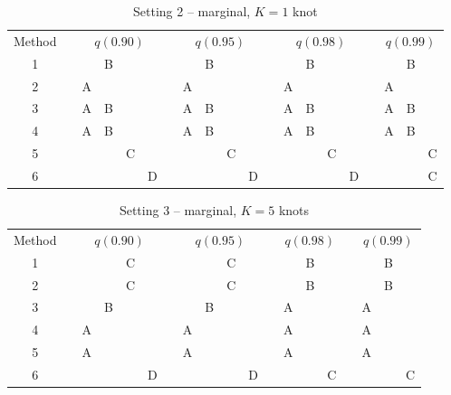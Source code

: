 \begin{table}[htbp]
  \centering
  \caption{Setting 2 -- \Skewt marginal, $K = 1$ knot}
  \label{sttbl:st1sim}
  \begin{tabular}{c c cccc c cccc c cccc c ccc}
  \toprule
    Method & \phantom{a} & \multicolumn{4}{c}{$q(0.90)$} & \phantom{a} & \multicolumn{4}{c}{$q(0.95)$} & \phantom{a} & \multicolumn{4}{c}{$q(0.98)$} & \phantom{a} & \multicolumn{3}{c}{$q(0.99)$} \\
    \cmidrule{1-1} \cmidrule{3-6} \cmidrule{8-11} \cmidrule{13-16} \cmidrule{18-20}
    1 &&   & B &   &   &&   & B &   &   &&   & B &   &   &&   & B &   \\
    2 && A &   &   &   && A &   &   &   && A &   &   &   && A &   &   \\
    3 && A & B &   &   && A & B &   &   && A & B &   &   && A & B &   \\
    4 && A & B &   &   && A & B &   &   && A & B &   &   && A & B &   \\
    5 &&   &   & C &   &&   &   & C &   &&   &   & C &   &&   &   & C \\
    6 &&   &   &   & D &&   &   &   & D &&   &   &   & D &&   &   & C \\
    \bottomrule
  \end{tabular}
\end{table}

\begin{table}[htbp]
  \centering
  \caption{Setting 3 -- \Skewt marginal, $K = 5$ knots}
  \label{sttbl:st5sim}
  \begin{tabular}{c c cccc c cccc c ccc c ccc}
  \toprule
    Method & \phantom{a} & \multicolumn{4}{c}{$q(0.90)$} & \phantom{a} & \multicolumn{4}{c}{$q(0.95)$} & \phantom{a} & \multicolumn{3}{c}{$q(0.98)$} & \phantom{a} & \multicolumn{3}{c}{$q(0.99)$} \\
    \cmidrule{1-1} \cmidrule{3-6} \cmidrule{8-11} \cmidrule{13-15} \cmidrule{17-19}
    1 &&   &   & C &   &&   &   & C &   &&   & B &   &&   & B &   \\
    2 &&   &   & C &   &&   &   & C &   &&   & B &   &&   & B &   \\
    3 &&   & B &   &   &&   & B &   &   && A &   &   && A &   &   \\
    4 && A &   &   &   && A &   &   &   && A &   &   && A &   &   \\
    5 && A &   &   &   && A &   &   &   && A &   &   && A &   &   \\
    6 &&   &   &   & D &&   &   &   & D &&   &   & C &&   &   & C \\
    \bottomrule
  \end{tabular}
\end{table}

